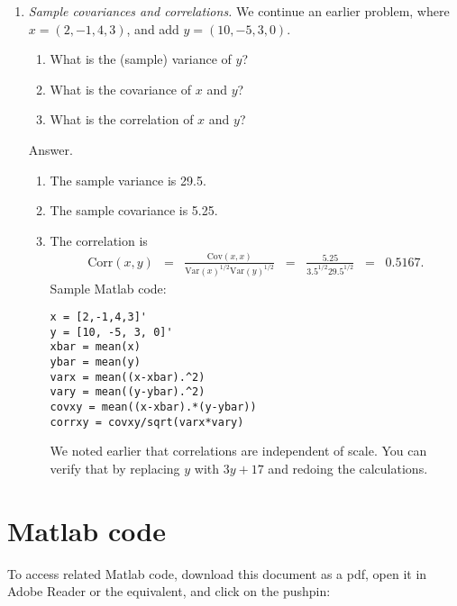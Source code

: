 \documentclass[11pt]{article}
\begin{document}
\begin{enumerate}
\item {\it Sample covariances and correlations.\/}
We continue an earlier problem, where $ x= (2,-1,4,3)$,
and add $y = (10,-5, 3, 0)$.
\begin{enumerate}
\item What is the (sample) variance of $y$?
\item What is the covariance of $x$ and $y$?
\item What is the correlation of $x$ and $y$?
\end{enumerate}

Answer.
\begin{enumerate}
\item The sample variance is 29.5.
\item The sample covariance is 5.25.
\item The correlation is
\begin{eqnarray*}
    \mbox{Corr}(x,y) &=&
            \frac {\mbox{Cov}(x,x)} {\mbox{Var}(x)^{1/2} \mbox{Var}(y)^{1/2} }
            \;\;=\;\; \frac{ 5.25} {3.5^{1/2} 29.5^{1/2}}
            \;\;=\;\; 0.5167 .
\end{eqnarray*}
Sample Matlab code:
\begin{verbatim}
x = [2,-1,4,3]'
y = [10, -5, 3, 0]'
xbar = mean(x)
ybar = mean(y)
varx = mean((x-xbar).^2)
vary = mean((y-ybar).^2)
covxy = mean((x-xbar).*(y-ybar))
corrxy = covxy/sqrt(varx*vary)
\end{verbatim}
We noted earlier that correlations are independent of scale.
You can verify that by replacing $y$ with $ 3y+17$ and redoing the calculations.
\end{enumerate}

\end{enumerate}


\section*{Matlab code}

To access related Matlab code, download this document as a pdf, open it in Adobe Reader or the equivalent, and click on the pushpin:



\end{document}
